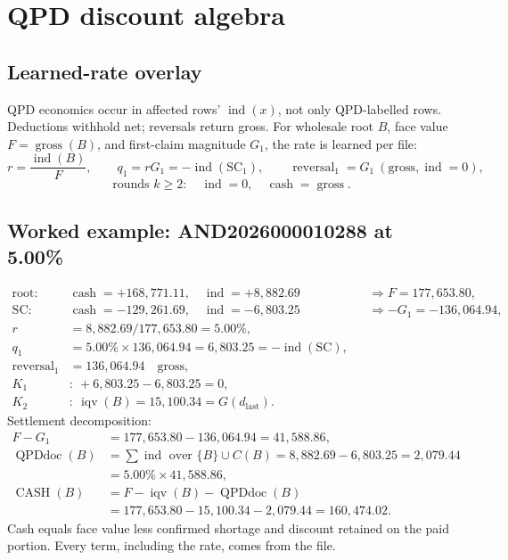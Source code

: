 \documentclass[11pt,a4paper]{article}
\newcommand{\cash}{\operatorname{cash}}
\newcommand{\gross}{\operatorname{gross}}
\newcommand{\ind}{\operatorname{ind}}
\theoremstyle{definition}
\begin{document}
\section{QPD discount algebra}
\subsection{Learned-rate overlay}
QPD economics occur in affected rows' $\ind(x)$, not only QPD-labelled
rows. Deductions withhold net; reversals return gross. For wholesale root
$B$, face value $F=\gross(B)$, and first-claim magnitude $G_1$, the rate
is learned per file:
\[
r=\frac{\ind(B)}{F},\qquad
q_1=rG_1=-\ind(\mathrm{SC}_1),\qquad
\operatorname{reversal}_1=G_1\ (\text{gross},\ind=0),
\]
\[
\text{rounds }k\ge2:\quad \ind=0,\quad\cash=\gross.
\]

\subsection{Worked example: AND2026000010288 at 5.00\%}
\begin{align*}
\text{root: }&\cash=+168{,}771.11,\quad\ind=+8{,}882.69
&&\Rightarrow F=177{,}653.80,\\
\text{SC: }&\cash=-129{,}261.69,\quad\ind=-6{,}803.25
&&\Rightarrow -G_1=-136{,}064.94,\\
r&=8{,}882.69/177{,}653.80=5.00\%,\\
q_1&=5.00\%\times136{,}064.94=6{,}803.25=-\ind(\mathrm{SC}),\\
\operatorname{reversal}_1&=136{,}064.94\quad\text{gross},\\
K_1&:\ +6{,}803.25-6{,}803.25=0,\\
K_2&:\ \operatorname{iqv}(B)=15{,}100.34=G(d_{\mathrm{last}}).
\end{align*}
Settlement decomposition:
\begin{align*}
F-G_1&=177{,}653.80-136{,}064.94=41{,}588.86,\\
\operatorname{QPDdoc}(B)&=\sum\ind\text{ over }\{B\}\cup C(B)
=8{,}882.69-6{,}803.25=2{,}079.44\\
&=5.00\%\times41{,}588.86,\\
\operatorname{CASH}(B)&=F-\operatorname{iqv}(B)-
\operatorname{QPDdoc}(B)\\
&=177{,}653.80-15{,}100.34-2{,}079.44=160{,}474.02.
\end{align*}
Cash equals face value less confirmed shortage and discount retained on
the paid portion. Every term, including the rate, comes from the file.
\end{document}
